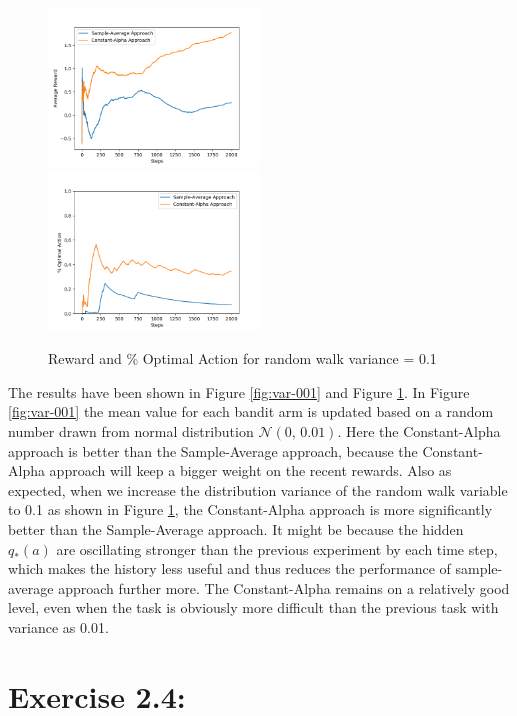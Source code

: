 \documentclass[10pt,letterpaper]{article}
\begin{document}
\begin{figure}[htp]
  \includegraphics[width=0.5\textwidth]{Reward-var-01}
  \includegraphics[width=0.5\textwidth]{Perc-var-01}
  \caption{Reward and \% Optimal Action for random walk variance = 0.1}
  \label{fig:var-01}
\end{figure}
The results have been shown in Figure \ref{fig:var-001} and Figure \ref{fig:var-01}. In Figure \ref{fig:var-001} the mean value for each bandit arm is updated based on a random number drawn from normal distribution $\mathcal{N}(0,\,0.01)$. Here the Constant-Alpha approach is better than the Sample-Average approach, because the Constant-Alpha approach will keep a bigger weight on the recent rewards. Also as expected, when we increase the distribution variance of the random walk variable to 0.1 as shown in Figure \ref{fig:var-01}, the Constant-Alpha approach is more significantly better than the Sample-Average approach. It might be because the hidden $q_*(a)$ are oscillating stronger than the previous experiment by each time step, which makes the history less useful and thus reduces the performance of sample-average approach further more. The Constant-Alpha remains on a relatively good level, even when the task is obviously more difficult than the previous task with variance as 0.01.



\section*{Exercise 2.4:}
\label{2.4}
\end{document}
